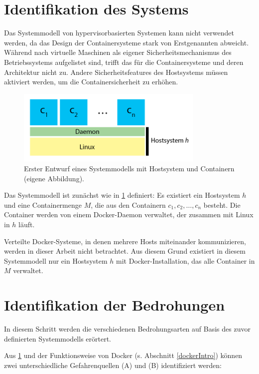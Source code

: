 \documentclass[../main.tex]{subfiles}
\begin{document}
  \section{Identifikation des Systems}
    Das Systemmodell von hypervisorbasierten Systemen kann nicht verwendet werden, da das Design der Containersysteme stark von Erstgenannten abweicht. Während nach \cite[S.125]{CISSP} virtuelle Maschinen als eigener Sicherheitsmechanismus des Betriebssystems aufgelistet sind, trifft das für die Containersysteme und deren Architektur nicht zu. Andere Sicherheitsfeatures des Hostsystems müssen aktiviert werden, um die Containersicherheit zu erhöhen.

    \begin{figure}[h]
        \centering
        \includegraphics[width=0.8\textwidth]{./images/question_model1.png}
        \caption{Erster Entwurf eines Systemmodells mit Hostsystem und Containern (eigene Abbildung).}
        \label{fig:question_model1}
    \end{figure}

    Das Systemmodell ist zunächst wie in \fig \ref{fig:question_model1} definiert: Es existiert ein Hostsystem \(h\) und eine Containermenge \(M\), die aus den Containern \(c_1,c_2,\dotsc,c_n\) besteht. Die Container werden von einem Docker-Daemon verwaltet, der zusammen mit Linux in \(h\) läuft.

    Verteilte Docker-Systeme, in denen mehrere Hosts miteinander kommunizieren, werden in dieser Arbeit nicht betrachtet. Aus diesem Grund existiert in diesem Systemmodell nur ein Hostsystem \(h\) mit Docker-Installation, das alle Container in \(M\) verwaltet.

  \section{Identifikation der Bedrohungen}
    In diesem Schritt werden die verschiedenen Bedrohungsarten auf Basis des zuvor definierten Systemmodells erörtert.

    Aus \fig \ref{fig:question_model1} und der Funktionsweise von Docker (s. Abschnitt \ref{dockerIntro}) können zwei unterschiedliche Gefahrenquellen (A) und (B) identifiziert werden:
\end{document}
